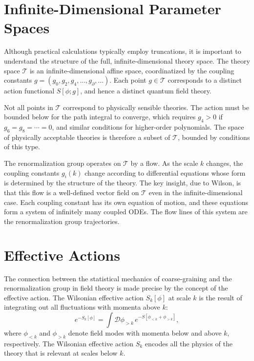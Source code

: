 \documentclass[11pt, twoside, openright]{book}
\theoremstyle{dotted}
\theoremstyle{definition}
\newcommand{\cT}{\mathcal{T}}          %
\begin{document}
\section{Infinite-Dimensional Parameter Spaces}

Although practical calculations typically employ truncations, it is important to
understand the structure of the full, infinite-dimensional theory space. The theory
space $\cT$ is an infinite-dimensional affine space, coordinatized by the coupling
constants $g = (g_0, g_2, g_4, \ldots, g_\partial, \ldots)$. Each point $g \in \cT$
corresponds to a distinct action functional $S[\phi; g]$, and hence a distinct
quantum field theory.

Not all points in $\cT$ correspond to physically sensible theories. The action must
be bounded below for the path integral to converge, which requires $g_4 > 0$ if
$g_6 = g_8 = \cdots = 0$, and similar conditions for higher-order polynomials. The
space of physically acceptable theories is therefore a subset of $\cT$, bounded by
conditions of this type.

The renormalization group operates on $\cT$ by a flow. As the scale $k$ changes,
the coupling constants $g_i(k)$ change according to differential equations whose
form is determined by the structure of the theory. The key insight, due to Wilson,
is that this flow is a well-defined vector field on $\cT$ even in the
infinite-dimensional case. Each coupling constant has its own equation of motion,
and these equations form a system of infinitely many coupled ODEs. The flow lines
of this system are the renormalization group trajectories.

\section{Effective Actions}

The connection between the statistical mechanics of coarse-graining and the
renormalization group in field theory is made precise by the concept of the
effective action. The Wilsonian effective action $S_k[\phi]$ at scale $k$ is the
result of integrating out all fluctuations with momenta above $k$:
\begin{equation}
  e^{-S_k[\phi]} = \int \mathcal{D}\phi_{>k} \, e^{-S[\phi_{<k} + \phi_{>k}]},
  \label{eq:wilsonian_eff}
\end{equation}
where $\phi_{<k}$ and $\phi_{>k}$ denote field modes with momenta below and above
$k$, respectively. The Wilsonian effective action $S_k$ encodes all the physics of
the theory that is relevant at scales below $k$.
\end{document}
